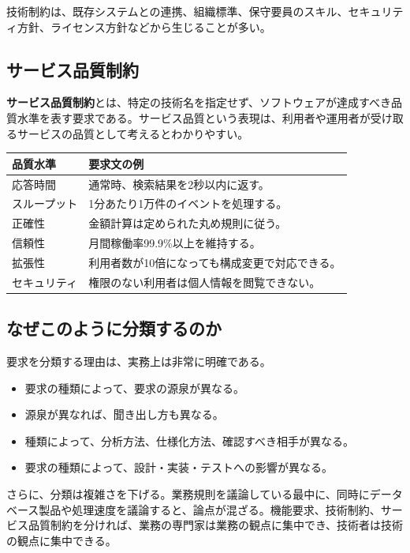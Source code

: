 \documentclass[uplatex,10pt,dvipdfmx,nomag]{jsarticle}
\newcommand{\term}[1]{\textbf{#1}}
\begin{document}
技術制約は、既存システムとの連携、組織標準、保守要員のスキル、セキュリティ方針、ライセンス方針などから生じることが多い。

\subsection{サービス品質制約}

\term{サービス品質制約}とは、特定の技術名を指定せず、ソフトウェアが達成すべき品質水準を表す要求である。サービス品質という表現は、利用者や運用者が受け取るサービスの品質として考えるとわかりやすい。

\begin{tabularx}{0.97\linewidth}{@{}p{.26\linewidth}X@{}}
\toprule
品質水準 & 要求文の例 \\
\midrule
応答時間 & 通常時、検索結果を2秒以内に返す。 \\
スループット & 1分あたり1万件のイベントを処理する。 \\
正確性 & 金額計算は定められた丸め規則に従う。 \\
信頼性 & 月間稼働率99.9\%以上を維持する。 \\
拡張性 & 利用者数が10倍になっても構成変更で対応できる。 \\
セキュリティ & 権限のない利用者は個人情報を閲覧できない。 \\
\bottomrule
\end{tabularx}

\subsection{なぜこのように分類するのか}

要求を分類する理由は、実務上は非常に明確である。

\begin{itemize}
\item 要求の種類によって、要求の源泉が異なる。
\item 源泉が異なれば、聞き出し方も異なる。
\item 種類によって、分析方法、仕様化方法、確認すべき相手が異なる。
\item 要求の種類によって、設計・実装・テストへの影響が異なる。
\end{itemize}

さらに、分類は複雑さを下げる。業務規則を議論している最中に、同時にデータベース製品や処理速度を議論すると、論点が混ざる。機能要求、技術制約、サービス品質制約を分ければ、業務の専門家は業務の観点に集中でき、技術者は技術の観点に集中できる。
\end{document}
